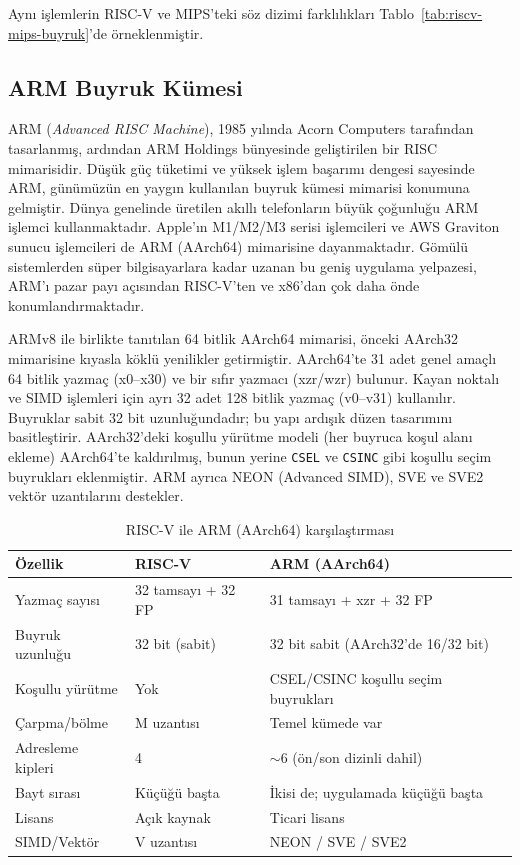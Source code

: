 Aynı işlemlerin RISC-V ve MIPS'teki söz dizimi farklılıkları Tablo~\ref{tab:riscv-mips-buyruk}'de örneklenmiştir.

\subsection{ARM Buyruk Kümesi}

ARM (\textit{Advanced RISC Machine}), 1985 yılında Acorn Computers tarafından tasarlanmış, ardından ARM Holdings bünyesinde geliştirilen bir RISC mimarisidir. Düşük güç tüketimi ve yüksek işlem başarımı dengesi sayesinde ARM, günümüzün en yaygın kullanılan buyruk kümesi mimarisi konumuna gelmiştir. Dünya genelinde üretilen akıllı telefonların büyük çoğunluğu ARM işlemci kullanmaktadır. Apple'ın M1/M2/M3 serisi işlemcileri ve AWS Graviton sunucu işlemcileri de ARM (AArch64) mimarisine dayanmaktadır. Gömülü sistemlerden süper bilgisayarlara kadar uzanan bu geniş uygulama yelpazesi, ARM'ı pazar payı açısından RISC-V'ten ve x86'dan çok daha önde konumlandırmaktadır.

ARMv8 ile birlikte tanıtılan 64 bitlik AArch64 mimarisi, önceki AArch32 mimarisine kıyasla köklü yenilikler getirmiştir. AArch64'te 31 adet genel amaçlı 64 bitlik yazmaç (x0--x30) ve bir sıfır yazmacı (xzr/wzr) bulunur. Kayan noktalı ve SIMD işlemleri için ayrı 32 adet 128 bitlik yazmaç (v0--v31) kullanılır. Buyruklar sabit 32 bit uzunluğundadır; bu yapı ardışık düzen tasarımını basitleştirir. AArch32'deki koşullu yürütme modeli (her buyruca koşul alanı ekleme) AArch64'te kaldırılmış, bunun yerine \texttt{CSEL} ve \texttt{CSINC} gibi koşullu seçim buyrukları eklenmiştir. ARM ayrıca NEON (Advanced SIMD), SVE ve SVE2 vektör uzantılarını destekler.

\begin{table}[H]
\centering
\caption{RISC-V ile ARM (AArch64) karşılaştırması}
\label{tab:riscv-arm-karsilastirma}
\small
\begin{tabular}{lll}
\toprule
\textbf{Özellik} & \textbf{RISC-V} & \textbf{ARM (AArch64)} \\
\midrule
Yazmaç sayısı        & 32 tamsayı + 32 FP      & 31 tamsayı + xzr + 32 FP \\
Buyruk uzunluğu      & 32 bit (sabit)          & 32 bit sabit (AArch32'de 16/32 bit) \\
Koşullu yürütme      & Yok                     & CSEL/CSINC koşullu seçim buyrukları \\
Çarpma/bölme         & M uzantısı              & Temel kümede var \\
Adresleme kipleri    & 4                       & $\sim$6 (ön/son dizinli dahil) \\
Bayt sırası          & Küçüğü başta            & İkisi de; uygulamada küçüğü başta \\
Lisans               & Açık kaynak             & Ticari lisans \\
SIMD/Vektör          & V uzantısı              & NEON / SVE / SVE2 \\
\bottomrule
\end{tabular}
\end{table}

